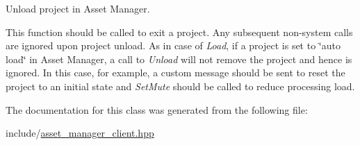 Unload project in Asset Manager. 

This function should be called to exit a project. Any subsequent non-\/system calls are ignored upon project unload. As in case of {\itshape Load\/}, if a project is set to \char`\"{}auto load\char`\"{} in Asset Manager, a call to {\itshape Unload\/} will not remove the project and hence is ignored. In this case, for example, a custom message should be sent to reset the project to an initial state and {\itshape SetMute\/} should be called to reduce processing load. 

The documentation for this class was generated from the following file:\begin{DoxyCompactItemize}
\item 
include/\hyperlink{asset__manager__client_8hpp}{asset\_\-manager\_\-client.hpp}\end{DoxyCompactItemize}
